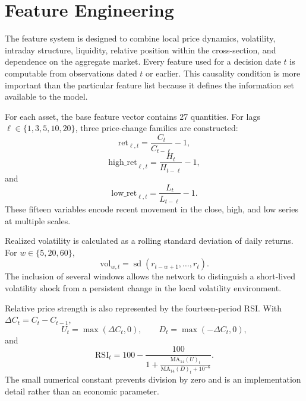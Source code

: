 \documentclass[10pt]{article}
\begin{document}
\section{Feature Engineering}

The feature system is designed to combine local price dynamics, volatility, intraday structure, liquidity, relative position within the cross-section, and dependence on the aggregate market. Every feature used for a decision date $t$ is computable from observations dated $t$ or earlier. This causality condition is more important than the particular feature list because it defines the information set available to the model.

For each asset, the base feature vector contains 27 quantities. For lags $\ell\in\{1,3,5,10,20\}$, three price-change families are constructed:
\begin{equation}
\mathrm{ret}_{\ell,t}=\frac{C_t}{C_{t-\ell}}-1,
\end{equation}
\begin{equation}
\mathrm{high\_ret}_{\ell,t}=\frac{H_t}{H_{t-\ell}}-1,
\end{equation}
and
\begin{equation}
\mathrm{low\_ret}_{\ell,t}=\frac{L_t}{L_{t-\ell}}-1.
\end{equation}
These fifteen variables encode recent movement in the close, high, and low series at multiple scales.

Realized volatility is calculated as a rolling standard deviation of daily returns. For $w\in\{5,20,60\}$,
\begin{equation}
\mathrm{vol}_{w,t}
=
\operatorname{sd}(r_{t-w+1},\ldots,r_t).
\end{equation}
The inclusion of several windows allows the network to distinguish a short-lived volatility shock from a persistent change in the local volatility environment.

Relative price strength is also represented by the fourteen-period RSI. With $\Delta C_t=C_t-C_{t-1}$,
\begin{equation}
U_t=\max(\Delta C_t,0),\qquad
D_t=\max(-\Delta C_t,0),
\end{equation}
and
\begin{equation}
\mathrm{RSI}_t=
100-
\frac{100}
{1+\frac{\mathrm{MA}_{14}(U)_t}
{\mathrm{MA}_{14}(D)_t+10^{-6}}}.
\end{equation}
The small numerical constant prevents division by zero and is an implementation detail rather than an economic parameter.
\end{document}
